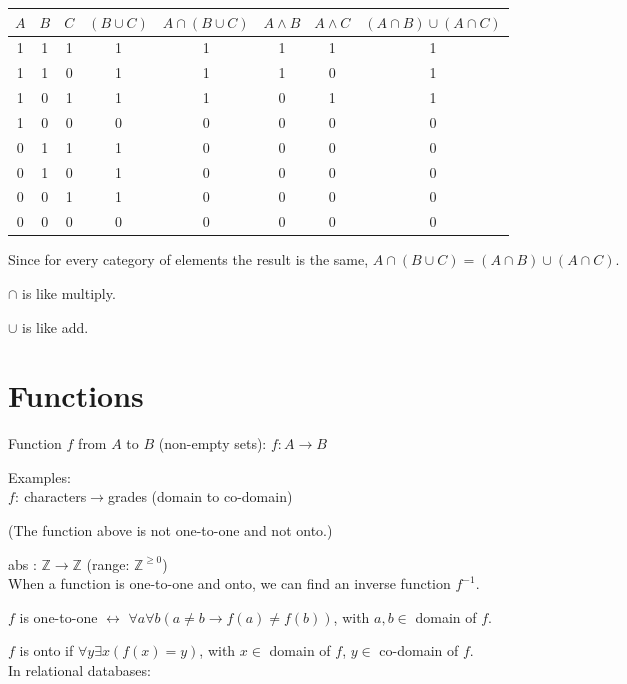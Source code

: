\documentclass[english,openany]{book}
\begin{document}
	\begin{tabular}{c|c|c|c|c|c|c|c}
		$A$&$B$&$C$&$(B \cup C)$&$A \cap (B \cup C)$&$A \wedge B$&$A \wedge C$&$(A \cap B) \cup (A \cap C)$\\
		\hline
		1&1&1&1&1&1&1&1\\
		1&1&0&1&1&1&0&1\\
		1&0&1&1&1&0&1&1\\
		1&0&0&0&0&0&0&0\\
		0&1&1&1&0&0&0&0\\
		0&1&0&1&0&0&0&0\\
		0&0&1&1&0&0&0&0\\
		0&0&0&0&0&0&0&0\\
	\end{tabular}

	Since for every category of elements the result is the same, $A \cap (B \cup C) = (A \cap B) \cup (A \cap C)$.

	$\cap$ is like multiply.

	$\cup$ is like add.

	\section{Functions}

	Function $f$ from $A$ to $B$ (non-empty sets): $f : A \rightarrow B$

    Examples:\\

	$f :\ $characters$ \rightarrow $grades (domain to co-domain)

    (The function above is not one-to-one and not onto.)

    abs : $\mathbb Z \rightarrow \mathbb Z$ (range: $\mathbb Z^{\geq 0}$)\\


    When a function is one-to-one and onto, we can find an inverse function $f^{-1}$.

    $f$ is one-to-one $\leftrightarrow$ $\forall a \forall b (a \neq b \rightarrow f(a) \neq f(b))$, with $a,b \in$ domain of $f$.

    $f$ is onto if $\forall y \exists x (f(x) = y)$, with $x \in$ domain of $f$, $y \in$ co-domain of $f$.\\

    In relational databases:
\end{document}
